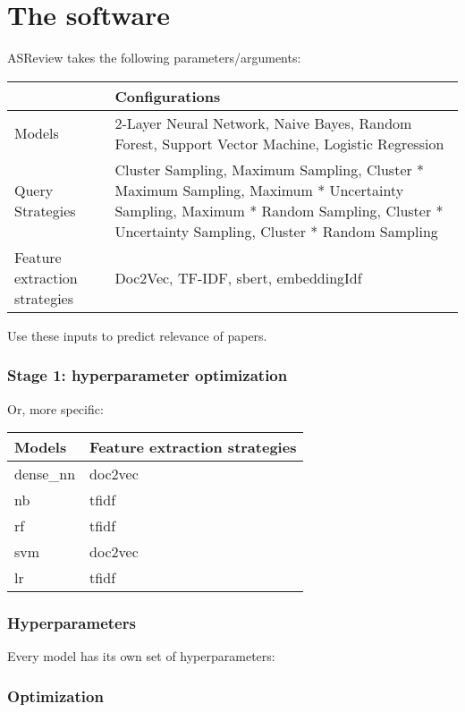 \documentclass[
]{article}
\begin{document}
\hypertarget{the-software}{%
\section{The software}\label{the-software}}

ASReview takes the following parameters/arguments:

\begin{tabu} to 
\toprule
  & Configurations\\
\midrule
Models & 2-Layer Neural Network, Naive Bayes, Random Forest, Support Vector Machine, Logistic Regression\\
Query Strategies & Cluster Sampling, Maximum Sampling, Cluster * Maximum  Sampling, Maximum * Uncertainty Sampling, Maximum * Random Sampling, Cluster * Uncertainty Sampling, Cluster * Random Sampling\\
Feature extraction strategies & Doc2Vec, TF-IDF, sbert, embeddingIdf\\
\bottomrule
\end{tabu}

Use these inputs to predict relevance of papers.

\hypertarget{stage-1-hyperparameter-optimization}{%
\subsubsection{Stage 1: hyperparameter
optimization}\label{stage-1-hyperparameter-optimization}}

Or, more specific:

\begin{tabular}{ll}
\toprule
Models & Feature extraction strategies\\
\midrule
dense\_nn & doc2vec\\
nb & tfidf\\
rf & tfidf\\
svm & doc2vec\\
lr & tfidf\\
\bottomrule
\end{tabular}

\hypertarget{hyperparameters}{%
\subsubsection{Hyperparameters}\label{hyperparameters}}

Every model has its own set of hyperparameters:

\hypertarget{optimization}{%
\subsubsection{Optimization}\label{optimization}}
\end{document}
